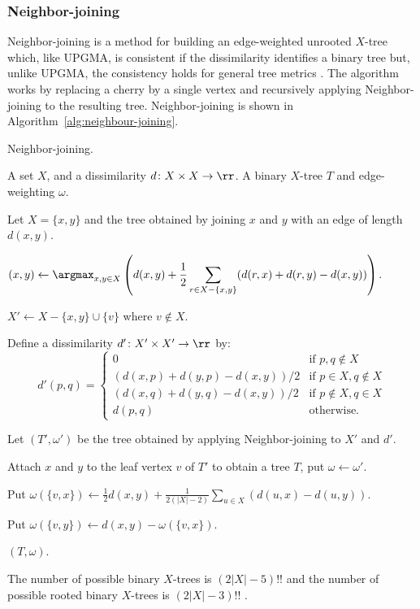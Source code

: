 
\subsubsection{Neighbor-joining}
\label{sec:neighbour-joining}

Neighbor-joining is a method for building an edge-weighted unrooted $X$-tree
which, like UPGMA, is consistent if the dissimilarity identifies a binary tree
but, unlike UPGMA, the consistency holds for general tree metrics
\cite{saitou1987nj}.  The algorithm works by replacing a cherry by a single
vertex and recursively applying Neighbor-joining to the resulting tree.
Neighbor-joining is shown in Algorithm~\ref{alg:neighbour-joining}.

\begin{algorithm}[h]
  \caption{Neighbor-joining.}
  \label{alg:neighbour-joining}

  \begin{algorithmic}
    \Require A set $X$, and a dissimilarity $d \colon X \times X \to \rr$.
    \Ensure  A binary $X$-tree $T$ and edge-weighting $\omega$.

     Let $X = \{x,y\}$ and \Return the tree obtained by joining
    $x$ and $y$ with an edge of length $d(x,y)$.
    \EndIf

    \State $\displaystyle (x,y) \gets \argmax_{x,y \in X} \left( d(x,y) + \frac{1}{2}
    \sum_{r \in X - \{x,y\}} (d(r,x)+d(r,y)-d(x,y))\right)$.

    \State $X' \gets X - \{x,y\} \cup \{v\}$ where $v \notin X$.

    \State Define a dissimilarity $d' \colon X' \times X' \to \rr$ by:
    \begin{equation*}
      d'(p,q) =
      \begin{cases}
        0 & \text{if $p,q \notin X$} \\
        (d(x,p)+d(y,p)-d(x,y))/2 & \text{if $p \in X, q \notin X$} \\
        (d(x,q)+d(y,q)-d(x,y))/2 & \text{if $p \notin X, q \in X$} \\
        d(p,q) & \text{otherwise.}
      \end{cases}
    \end{equation*}

    \State Let $(T',\omega')$ be the tree obtained by applying
    Neighbor-joining to $X'$ and $d'$.

    \State Attach $x$ and $y$ to the leaf vertex $v$ of $T'$ to obtain a tree
    $T$, put $\omega \gets \omega'$.

    \State Put $\displaystyle \omega(\{v,x\}) \gets \frac{1}{2} d(x,y) +
    \frac{1}{2(|X|-2)} \sum_{u \in X} (d(u,x)-d(u,y))$.

    \State Put $\omega(\{v,y\}) \gets d(x,y) - \omega(\{v,x\})$.

    \State \Return $(T,\omega)$.
  \end{algorithmic}
\end{algorithm}


The number of possible binary $X$-trees is $(2|X|-5)!!$ and the number of
possible rooted binary $X$-trees is $(2|X|-3)!!$
\cite{felsenstein2004inferring}.
